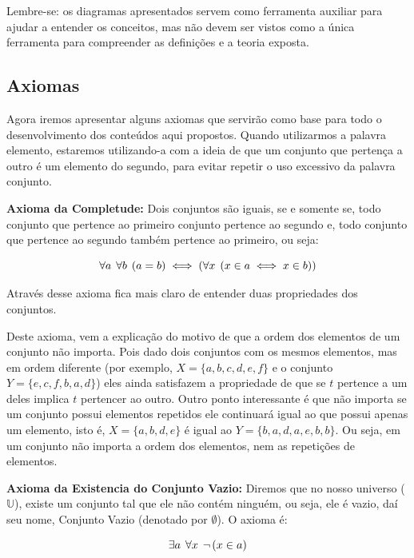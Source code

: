     Lembre-se: os diagramas apresentados servem como ferramenta auxiliar para ajudar a entender os conceitos, mas não devem ser vistos como a única ferramenta para compreender as definições e  a teoria exposta.
    
    \subsection{Axiomas}
    
    Agora iremos apresentar alguns axiomas que servirão como base para todo o desenvolvimento dos conteúdos aqui propostos. Quando utilizarmos a palavra elemento, estaremos utilizando-a com a ideia de que um conjunto que pertença a outro é um elemento do segundo, para evitar repetir o uso excessivo da palavra conjunto.
    
    \textbf{Axioma da Completude:} Dois conjuntos são iguais, se e somente se, todo conjunto que pertence ao primeiro conjunto pertence ao segundo e, todo conjunto que pertence ao segundo também pertence ao primeiro, ou seja:
    
    \[\forall a \hspace{1.5mm} \forall b \hspace{1.5mm} (a = b) \iff (\forall x \hspace{1.5mm} (x \in a \iff x \in b))\] 
    
    Através desse axioma fica mais claro de entender duas propriedades dos conjuntos. 
    
    Deste axioma, vem a explicação do motivo de que a ordem dos elementos de um conjunto não importa. Pois dado dois conjuntos com os mesmos elementos, mas em ordem diferente (por exemplo, $X=\{a,b,c,d,e,f\}$ e o conjunto $Y=\{e,c,f,b,a,d\}$) eles ainda satisfazem a propriedade de que se $t$ pertence a um deles implica $t$ pertencer ao outro. Outro ponto interessante é que não importa se um conjunto possui elementos repetidos ele continuará igual ao que possui apenas um elemento, isto é, $X=\{a,b,d,e\}$ é igual ao $Y=\{b,a,d,a,e,b,b\}$. Ou seja, em um conjunto não importa a ordem dos elementos, nem as repetições de elementos.
    
    \textbf{Axioma da Existencia do Conjunto Vazio: } Diremos que no nosso universo ($\mathbb{U}$), existe um conjunto tal que ele não contém ninguém, ou seja, ele é vazio, daí seu nome, Conjunto Vazio (denotado por $\emptyset$). O axioma é:
        
        \[\exists a \hspace{1.5mm} \forall x \hspace{1.5mm} \neg\hspace{0.5mm} (x \in a)\]
    
